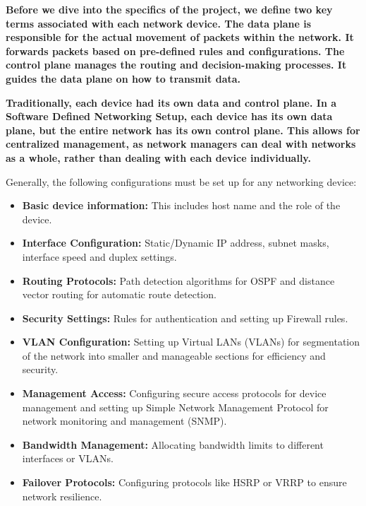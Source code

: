 \documentclass[11pt]{article}
\providecommand{\tightlist}{%
      \setlength{\itemsep}{0pt}\setlength{\parskip}{0pt}}
\begin{document}
\textbf{Before we dive into the specifics of the project, we define two
key terms associated with each network device. The data plane is
responsible for the actual movement of packets within the network. It
forwards packets based on pre-defined rules and configurations. The
control plane manages the routing and decision-making processes. It
guides the data plane on how to transmit data.}

\textbf{Traditionally, each device had its own data and control plane.
In a Software Defined Networking Setup, each device has its own data
plane, but the entire network has its own control plane. This allows for
centralized management, as network managers can deal with networks as a
whole, rather than dealing with each device individually.}

Generally, the following configurations must be set up for any
networking device:

\begin{itemize}
\tightlist
\item
  \textbf{Basic device information:} This includes host name and the
  role of the device.
\item
  \textbf{Interface Configuration:} Static/Dynamic IP address, subnet
  masks, interface speed and duplex settings.
\item
  \textbf{Routing Protocols:} Path detection algorithms for OSPF and
  distance vector routing for automatic route detection.
\item
  \textbf{Security Settings:} Rules for authentication and setting up
  Firewall rules.
\item
  \textbf{VLAN Configuration:} Setting up Virtual LANs (VLANs) for
  segmentation of the network into smaller and manageable sections for
  efficiency and security.
\item
  \textbf{Management Access:} Configuring secure access protocols for
  device management and setting up Simple Network Management Protocol
  for network monitoring and management (SNMP).
\item
  \textbf{Bandwidth Management:} Allocating bandwidth limits to
  different interfaces or VLANs.
\item
  \textbf{Failover Protocols:} Configuring protocols like HSRP or VRRP
  to ensure network resilience.
\end{itemize}
\end{document}

